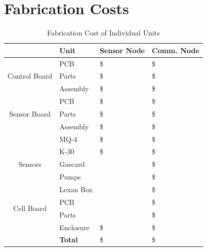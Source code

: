\documentclass[journal]{IEEEtran}
\begin{document}
	\section{Fabrication Costs}
	\begin{table}[!t]
		\centering
		\caption{Fabrication Cost of Individual Units}
		\label{tab:onecosts}
		\begin{tabular}{cl|l|l}
			& Unit           & Sensor Node    & Comm. Node       \\ \hline 
			\multirow{3}{*}{Control Board} 
			& PCB            & \$\costonepcb  & \$\costonepcb    \\
			& Parts          & \$\costcparts  & \$\costcpartc    \\
			& Assembly       & \$\costcasyms  & \$\costcasymc    \\ \hline
			\multirow{3}{*}{Sensor Board}  
			& PCB            & \$\costonepcb  & \$\costonepcb    \\
			& Parts          & \$\costsparts  & \$\costsparts    \\ 
			& Assembly       & \$\costsasym   & \$\costsasym     \\ \hline
			\multirow{5}{*}{Sensors}       
			& MQ-4           & \$\costoneMQ   & \$\costoneMQ     \\
			& K-30           & \$\costoneK    & \$\costoneK      \\
			& Gascard        &                & \$\costoneGC     \\
			& Pumps          &                & \$\costonepump   \\
			& Lexan Box      &                & \$\costonelex    \\ \hline
			\multirow{2}{*}{Cell Board}    
			& PCB            &                & \$\costonepcb    \\
			& Parts          &                & \$\costcellpart  \\ \hline
			& Enclosure      & \$\costonetycsm& \$\costonetyclg  \\ \cline{2-4} 
			& \textbf{Total} & \$\costsumone  & \$\costsumtwo   
		\end{tabular}
	\end{table}
	
\end{document}
